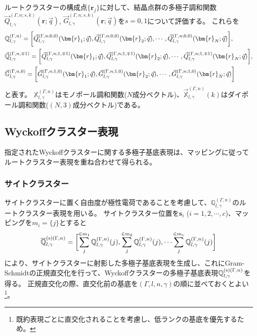 \documentclass[11pt]{easymemo}
\begin{document}
ルートクラスターの構成点$\{\bm{r}_{j}\}$に対して、結晶点群の多極子調和関数$\vec{Q}_{l,\gamma}^{(\Gamma,n;s,k)}(\bm{r};\vec{q})$, $\vec{G}_{l,\gamma}^{(\Gamma,n;s,k)}(\bm{r};\vec{q})$を$s=0,1$について評価する。
これらを
\begin{align}
&
\mathbb{Q}_{l,\gamma}^{(\Gamma,n)}=\biggl[\vec{Q}_{l,\gamma}^{(\Gamma,n;0,0)}(\bm{r}_{1};\vec{q}),\vec{Q}_{l,\gamma}^{(\Gamma,n;0,0)}(\bm{r}_{2};\vec{q}),\cdots,\vec{Q}_{l,\gamma}^{(\Gamma,n;0,0)}(\bm{r}_{N};\vec{q})\biggr],
\\&
\vec{\mathbb{Q}}_{l,\gamma}^{(\Gamma,n,\mp1)}=\biggl[\vec{Q}_{l,\gamma}^{(\Gamma,n;1,\mp1)}(\bm{r}_{1};\vec{q}),\vec{Q}_{l,\gamma}^{(\Gamma,n;1,\mp1)}(\bm{r}_{2};\vec{q}),\cdots,\vec{Q}_{l,\gamma}^{(\Gamma,n;1,\mp1)}(\bm{r}_{N};\vec{q})\biggr],
\cr&
\vec{\mathbb{G}}_{l,\gamma}^{(\Gamma,n,0)}=\biggl[\vec{G}_{l,\gamma}^{(\Gamma,n;1,0)}(\bm{r}_{1};\vec{q}),\vec{G}_{l,\gamma}^{(\Gamma,n;1,0)}(\bm{r}_{2};\vec{q}),\cdots,\vec{G}_{l,\gamma}^{(\Gamma,n;1,0)}(\bm{r}_{N};\vec{q})\biggr]
\end{align}
と表す。
$\mathbb{X}_{l,\gamma}^{(\Gamma,n)}$はモノポール調和関数($N$成分ベクトル)、$\vec{\mathbb{X}}_{l,\gamma}^{(\Gamma,n)}(k)$はダイポール調和関数($(N,3)$成分ベクトル)である。


\subsection{Wyckoffクラスター表現}

指定されたWyckoffクラスターに関する多極子基底表現は、マッピングに従ってルートクラスター表現を重ね合わせて得られる。

\subsubsection{サイトクラスター}

サイトクラスターに置く自由度が極性電荷であることを考慮して、$\mathbb{Q}_{l,\gamma}^{(\Gamma,n)}$のルートクラスター表現を用いる。
サイトクラスター位置を$\bm{s}_{i}$ ($i=1,2,\cdots,c$)、マッピングを$m_{i}=\{j\}$とすると
\begin{align}
\overline{\mathbb{Q}}_{l,\gamma}^{{\rm (s)}(\Gamma,n)}=\biggl[
\sum_{j}^{\in m_{1}}\mathbb{Q}_{l,\gamma}^{(\Gamma,n)}(j),
\sum_{j}^{\in m_{2}}\mathbb{Q}_{l,\gamma}^{(\Gamma,n)}(j),
\cdots
\sum_{j}^{\in m_{c}}\mathbb{Q}_{l,\gamma}^{(\Gamma,n)}(j)
\biggr]
\end{align}
により、サイトクラスターに射影した多極子基底表現を生成し、これにGram-Schmidtの正規直交化を行って、Wyckoffクラスターの多極子基底表現$\mathbb{Q}_{l,\gamma}^{{\rm (s)}(\Gamma,n)}$を得る。
正規直交化の際、直交化前の基底を$(\Gamma,l,n,\gamma)$の順に並べておくとよい\footnote{既約表現ごとに直交化されることを考慮し、低ランクの基底を優先するため。}。
\end{document}
